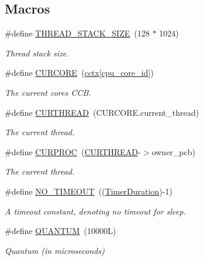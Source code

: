 \subsection*{Macros}
\begin{DoxyCompactItemize}
\item 
\#define \hyperlink{group__scheduler_ga90b7a8cb7bc3fdbd98014a3e15ee6e9a}{T\+H\+R\+E\+A\+D\+\_\+\+S\+T\+A\+C\+K\+\_\+\+S\+I\+ZE}~(128 $\ast$ 1024)
\begin{DoxyCompactList}\small\item\em Thread stack size. \end{DoxyCompactList}\item 
\mbox{\label{group__scheduler_ga869aabe01f7b28027376354dd895b96b}} 
\#define \hyperlink{group__scheduler_ga869aabe01f7b28027376354dd895b96b}{C\+U\+R\+C\+O\+RE}~(\hyperlink{group__scheduler_ga3be3b151b275926dff3fb99bee765eab}{cctx}\mbox{[}\hyperlink{bios_8h_abac58ced7d51f54f2318b326bc991933}{cpu\+\_\+core\+\_\+id}\mbox{]})
\begin{DoxyCompactList}\small\item\em The current core\textquotesingle{}s C\+CB. \end{DoxyCompactList}\item 
\#define \hyperlink{group__scheduler_ga587a82c8931f0df72f43cc913ceb7e27}{C\+U\+R\+T\+H\+R\+E\+AD}~(C\+U\+R\+C\+O\+R\+E.\+current\+\_\+thread)
\begin{DoxyCompactList}\small\item\em The current thread. \end{DoxyCompactList}\item 
\#define \hyperlink{group__scheduler_gae3437e8e6787ef05b6576d03c5b6a0ca}{C\+U\+R\+P\+R\+OC}~(\hyperlink{group__scheduler_ga587a82c8931f0df72f43cc913ceb7e27}{C\+U\+R\+T\+H\+R\+E\+AD}-\/$>$owner\+\_\+pcb)
\begin{DoxyCompactList}\small\item\em The current thread. \end{DoxyCompactList}\item 
\mbox{\label{group__scheduler_ga462fb2ba6f2af99ec3d021ded436bb65}} 
\#define \hyperlink{group__scheduler_ga462fb2ba6f2af99ec3d021ded436bb65}{N\+O\+\_\+\+T\+I\+M\+E\+O\+UT}~((\hyperlink{bios_8h_ae7291e5cd742fb9bc6d4aaa0d51bd0ee}{Timer\+Duration})-\/1)
\begin{DoxyCompactList}\small\item\em A timeout constant, denoting no timeout for sleep. \end{DoxyCompactList}\item 
\#define \hyperlink{group__scheduler_gabc4f0f9abea1b5443308e4ea84b52b21}{Q\+U\+A\+N\+T\+UM}~(10000\+L)
\begin{DoxyCompactList}\small\item\em Quantum (in microseconds) \end{DoxyCompactList}\end{DoxyCompactItemize}
